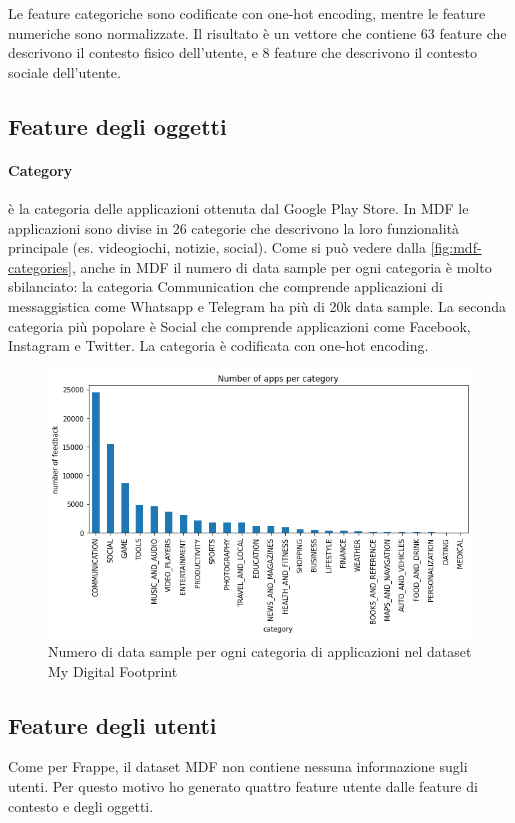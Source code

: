 \documentclass[12pt,italian]{report}
\begin{document}
\bigskip \noindent
Le feature categoriche sono codificate con one-hot encoding, mentre le feature numeriche sono normalizzate. Il risultato è un vettore che contiene 63 feature che descrivono il contesto fisico dell'utente, e 8 feature che descrivono il contesto sociale dell'utente.

\subsection{Feature degli oggetti}

\paragraph{Category}
è la categoria delle applicazioni ottenuta dal Google Play Store. In
MDF le applicazioni sono divise in 26 categorie che descrivono la loro funzionalità principale (es. videogiochi, notizie, social). Come si può vedere dalla \autoref{fig:mdf-categories}, anche in MDF il numero di data sample per ogni categoria è molto sbilanciato: la categoria Communication che comprende applicazioni di messaggistica come Whatsapp e Telegram ha più di
20k data sample. La seconda categoria più popolare è Social che comprende applicazioni come Facebook, Instagram e Twitter. La categoria è codificata con one-hot encoding.

\begin{figure}
  \centering
  \includegraphics[width=\linewidth]{immagini/mdf-category.png}
  \caption{Numero di data sample per ogni categoria di applicazioni nel dataset My Digital Footprint}
  \label{fig:mdf-categories}
\end{figure}

\subsection{Feature degli utenti}
Come per Frappe, il dataset MDF non contiene nessuna informazione sugli utenti. Per questo motivo ho generato quattro feature utente dalle feature di contesto e degli oggetti.
\end{document}
